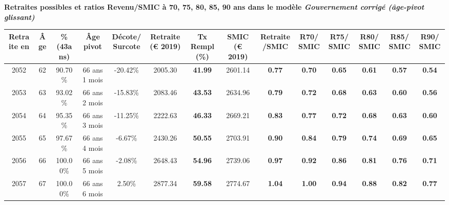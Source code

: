  \vspace{0.1cm} 
{\bf \noindent Retraites possibles et ratios Revenu/SMIC à 70, 75, 80, 85, 90 ans dans le modèle \emph{Gouvernement corrigé (âge-pivot glissant)}}  
 
\begin{adjustbox}{max width=\textwidth} 
\begin{tabular}[htb]{|c|c||c|c|c||c|c||c|c||c|c|c|c|c|} 
\hline 
 Retraite en &  Âge &  \%(43ans) &  Âge pivot &  Décote/Surcote &  Retraite (\euro{} 2019) &  Tx Rempl(\%) &  SMIC (\euro{} 2019) &  Retraite/SMIC &  R70/SMIC &  R75/SMIC &  R80/SMIC &  R85/SMIC &  R90/SMIC \\ 
\hline \hline 
 2052 &  62 &  90.70\% &  66 ans 1 mois &  -20.42\% &  2005.30 &  {\bf 41.99} &  2601.14 &  {\bf {\color{red} 0.77}} &  {\bf {\color{red} 0.70}} &  {\bf {\color{red} 0.65}} &  {\bf {\color{red} 0.61}} &  {\bf {\color{red} 0.57}} &  {\bf {\color{red} 0.54}} \\ 
\hline 
 2053 &  63 &  93.02\% &  66 ans 2 mois &  -15.83\% &  2083.46 &  {\bf 43.53} &  2634.96 &  {\bf {\color{red} 0.79}} &  {\bf {\color{red} 0.72}} &  {\bf {\color{red} 0.68}} &  {\bf {\color{red} 0.63}} &  {\bf {\color{red} 0.60}} &  {\bf {\color{red} 0.56}} \\ 
\hline 
 2054 &  64 &  95.35\% &  66 ans 3 mois &  -11.25\% &  2222.63 &  {\bf 46.33} &  2669.21 &  {\bf {\color{red} 0.83}} &  {\bf {\color{red} 0.77}} &  {\bf {\color{red} 0.72}} &  {\bf {\color{red} 0.68}} &  {\bf {\color{red} 0.63}} &  {\bf {\color{red} 0.60}} \\ 
\hline 
 2055 &  65 &  97.67\% &  66 ans 4 mois &  -6.67\% &  2430.26 &  {\bf 50.55} &  2703.91 &  {\bf {\color{red} 0.90}} &  {\bf {\color{red} 0.84}} &  {\bf {\color{red} 0.79}} &  {\bf {\color{red} 0.74}} &  {\bf {\color{red} 0.69}} &  {\bf {\color{red} 0.65}} \\ 
\hline 
 2056 &  66 &  100.00\% &  66 ans 5 mois &  -2.08\% &  2648.43 &  {\bf 54.96} &  2739.06 &  {\bf {\color{red} 0.97}} &  {\bf {\color{red} 0.92}} &  {\bf {\color{red} 0.86}} &  {\bf {\color{red} 0.81}} &  {\bf {\color{red} 0.76}} &  {\bf {\color{red} 0.71}} \\ 
\hline 
 2057 &  67 &  100.00\% &  66 ans 6 mois &  2.50\% &  2877.34 &  {\bf 59.58} &  2774.67 &  {\bf 1.04} &  {\bf {\color{red} 1.00}} &  {\bf {\color{red} 0.94}} &  {\bf {\color{red} 0.88}} &  {\bf {\color{red} 0.82}} &  {\bf {\color{red} 0.77}} \\ 
\hline 
\hline 
\end{tabular} 
\end{adjustbox} 
 
